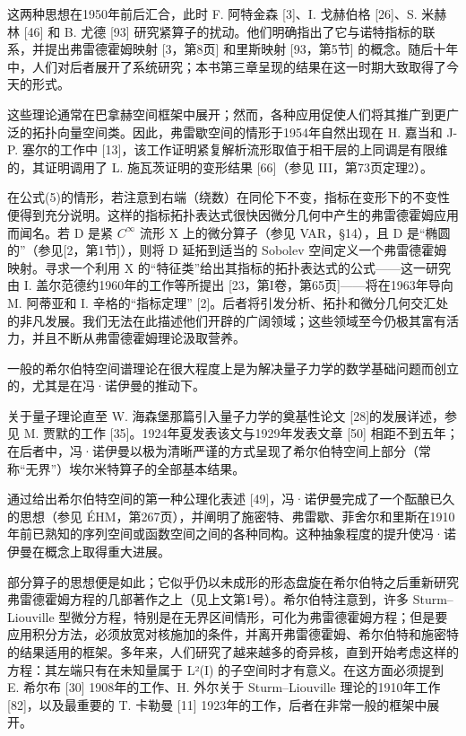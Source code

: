 这两种思想在1950年前后汇合，此时 F. 阿特金森 {[}3{]}、I. 戈赫伯格 {[}26{]}、S. 米赫林 {[}46{]} 和 B. 尤德 {[}93{]} 研究紧算子的扰动。他们明确指出了它与诺特指标的联系，并提出弗雷德霍姆映射 {[}3，第8页{]} 和里斯映射 {[}93，第5节{]} 的概念。随后十年中，人们对后者展开了系统研究；本书第三章呈现的结果在这一时期大致取得了今天的形式。

这些理论通常在巴拿赫空间框架中展开；然而，各种应用促使人们将其推广到更广泛的拓扑向量空间类。因此，弗雷歇空间的情形于1954年自然出现在 H. 嘉当和 J-P. 塞尔的工作中 {[}13{]}，该工作证明紧复解析流形取值于相干层的上同调是有限维的，其证明调用了 L. 施瓦茨证明的变形结果 {[}66{]}（参见 III，第73页定理2）。

在公式(5)的情形，若注意到右端（绕数）在同伦下不变，指标在变形下的不变性便得到充分说明。这样的指标拓扑表达式很快因微分几何中产生的弗雷德霍姆应用而闻名。若 D 是紧 \(C^{\infty}\) 流形 X 上的微分算子（参见 VAR，§14），且 D 是“椭圆的”（参见{[}2，第1节{]}），则将 D 延拓到适当的 Sobolev 空间定义一个弗雷德霍姆映射。寻求一个利用 X 的“特征类”给出其指标的拓扑表达式的公式——这一研究由 I. 盖尔范德约1960年的工作等所提出 {[}23，第I卷，第65页{]}——将在1963年导向 M. 阿蒂亚和 I. 辛格的“指标定理” {[}2{]}。后者将引发分析、拓扑和微分几何交汇处的非凡发展。我们无法在此描述他们开辟的广阔领域；这些领域至今仍极其富有活力，并且不断从弗雷德霍姆理论汲取营养。


一般的希尔伯特空间谱理论在很大程度上是为解决量子力学的数学基础问题而创立的，尤其是在冯·诺伊曼的推动下。

关于量子理论直至 W. 海森堡那篇引入量子力学的奠基性论文 {[}28{]}的发展详述，参见 M. 贾默的工作 {[}35{]}。1924年夏发表该文与1929年发表文章 {[}50{]} 相距不到五年；在后者中，冯·诺伊曼以极为清晰严谨的方式呈现了希尔伯特空间上部分（常称“无界”）埃尔米特算子的全部基本结果。

通过给出希尔伯特空间的第一种公理化表述 {[}49{]}，冯·诺伊曼完成了一个酝酿已久的思想（参见 ÉHM，第267页），并阐明了施密特、弗雷歇、菲舍尔和里斯在1910年前已熟知的序列空间或函数空间之间的各种同构。这种抽象程度的提升使冯·诺伊曼在概念上取得重大进展。

部分算子的思想便是如此；它似乎仍以未成形的形态盘旋在希尔伯特之后重新研究弗雷德霍姆方程的几部著作之上（见上文第1号）。希尔伯特注意到，许多 Sturm--Liouville 型微分方程，特别是在无界区间情形，可化为弗雷德霍姆方程；但是要应用积分方法，必须放宽对核施加的条件，并离开弗雷德霍姆、希尔伯特和施密特的结果适用的框架。多年来，人们研究了越来越多的奇异核，直到开始考虑这样的方程：其左端只有在未知量属于 L²(I) 的子空间时才有意义。在这方面必须提到 E. 希尔布 {[}30{]} 1908年的工作、H. 外尔关于 Sturm--Liouville 理论的1910年工作 {[}82{]}，以及最重要的 T. 卡勒曼 {[}11{]} 1923年的工作，后者在非常一般的框架中展开。

